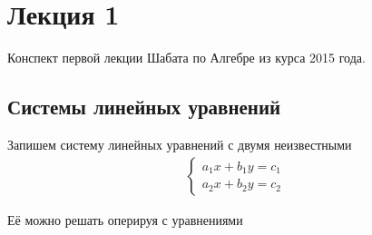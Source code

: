 \documentclass{article}
\begin{document}
\tableofcontents
\section{Лекция 1}
Конспект первой лекции Шабата по Алгебре из курса 2015 года.

\subsection{Системы линейных уравнений}

Запишем систему линейных уравнений с двумя неизвестными
\begin{gather}
    \begin{cases} 
        a_1 x + b_1 y  = c_1 \\ 
        a_2 x + b_2 y  = c_2
    \end{cases} 
\end{gather}

Её можно решать оперируя с уравнениями 
\end{document}
